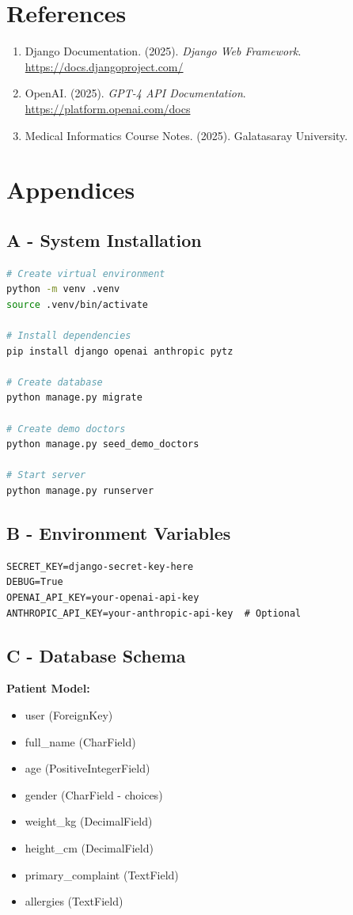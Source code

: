 \documentclass[12pt,a4paper]{article}
\begin{document}
\section{References}

\begin{enumerate}
    \item Django Documentation. (2025). \textit{Django Web Framework}. \url{https://docs.djangoproject.com/}
    \item OpenAI. (2025). \textit{GPT-4 API Documentation}. \url{https://platform.openai.com/docs}
    \item Medical Informatics Course Notes. (2025). Galatasaray University.
\end{enumerate}

\section{Appendices}

\subsection{A - System Installation}
\begin{lstlisting}[language=bash, caption=Installation commands]
# Create virtual environment
python -m venv .venv
source .venv/bin/activate

# Install dependencies
pip install django openai anthropic pytz

# Create database
python manage.py migrate

# Create demo doctors
python manage.py seed_demo_doctors

# Start server
python manage.py runserver
\end{lstlisting}

\subsection{B - Environment Variables}
\begin{lstlisting}[caption=.env file]
SECRET_KEY=django-secret-key-here
DEBUG=True
OPENAI_API_KEY=your-openai-api-key
ANTHROPIC_API_KEY=your-anthropic-api-key  # Optional
\end{lstlisting}

\subsection{C - Database Schema}

\textbf{Patient Model:}
\begin{itemize}
    \item user (ForeignKey)
    \item full\_name (CharField)
    \item age (PositiveIntegerField)
    \item gender (CharField - choices)
    \item weight\_kg (DecimalField)
    \item height\_cm (DecimalField)
    \item primary\_complaint (TextField)
    \item allergies (TextField)
\end{itemize}
\end{document}

